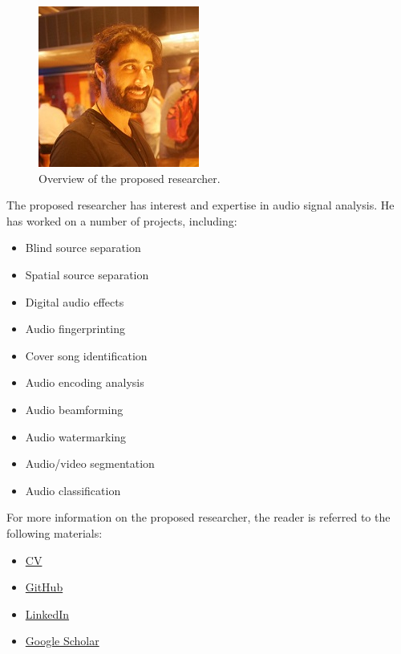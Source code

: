 \documentclass{article}
\begin{document}
\begin{figure}[htb]
\centering
\includegraphics[width=0.5\columnwidth]{Images/zafar.jpg}
\caption{Overview of the proposed researcher.}
\label{fig:zafar}
\end{figure}

The proposed researcher has interest and expertise in audio signal analysis. He has worked on a number of projects, including:
\begin{itemize}[noitemsep,topsep=0pt]
\item Blind source separation
\item Spatial source separation
\item Digital audio effects
\item Audio fingerprinting
\item Cover song identification
\item Audio encoding analysis
\item Audio beamforming
\item Audio watermarking
\item Audio/video segmentation
\item Audio classification
\end{itemize}

For more information on the proposed researcher, the reader is referred to the following materials:
\begin{itemize}[noitemsep,topsep=0pt]
\item \href{Zafar Rafii - CV.pdf}{CV}
\item \href{https://github.com/zafarrafii}{GitHub}
\item \href{https://www.linkedin.com/in/zafarrafii/}{LinkedIn}
\item \href{https://scholar.google.com/citations?user=8wbS2EsAAAAJ&hl=en}{Google Scholar}
\end{itemize}
\end{document}
